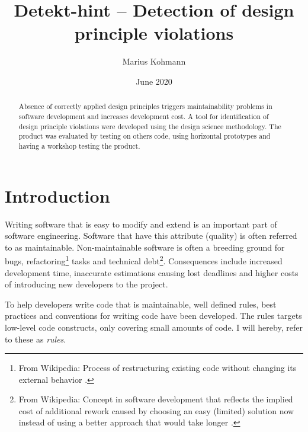 \documentclass{report}
\title{Detekt-hint -- Detection of design principle violations}
\author{Marius Kohmann}
\date{June 2020}
\begin{document}
\maketitle

\begin{abstract}
	Absence of correctly applied design principles triggers maintainability problems in software development and increases development cost. A tool for identification of design principle violations were developed using the design science methodology. The product was evaluated by testing on others code, using horizontal prototypes and having a workshop testing the product. 
	
	
	
\end{abstract}


\clearpage
\tableofcontents
\clearpage
\chapter{Introduction}



Writing software that is easy to modify and extend is an important part of software engineering. Software that have this attribute (quality) is often referred to as maintainable. Non-maintainable software is often a breeding ground for bugs, refactoring\footnote{From Wikipedia: Process of restructuring existing code without changing its external behavior \cite{refactoring}.} tasks and technical debt\footnote{From Wikipedia: Concept in software development that reflects the implied cost of additional rework caused by choosing an easy (limited) solution now instead of using a better approach that would take longer \cite{technicalDebt}.}. Consequences include increased development time, inaccurate estimations causing lost deadlines and higher costs of introducing new developers to the project.

To help developers write code that is maintainable, well defined rules, best practices and conventions for writing code have been developed. The rules targets low-level code constructs, only covering small amounts of code. I will hereby, refer to these as \textit{rules}. %
\end{document}
